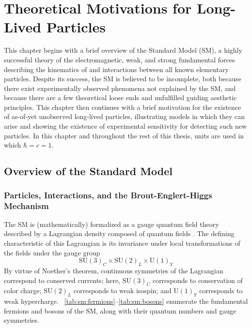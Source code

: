 \newcommand{\mtworow}[1]{\multirow{2}{*}{#1}}

\chapter{Theoretical Motivations for Long-Lived Particles}
\label{chap:theory}

This chapter begins with a brief overview of the Standard Model (SM), a highly successful theory of the electromagnetic, weak, and strong fundamental forces describing the kinematics of and interactions between all known elementary particles.
Despite its success, the SM is believed to be incomplete, both because there exist experimentally observed phenomena not explained by the SM, and because there are a few theoretical loose ends and unfulfilled guiding aesthetic principles. 
This chapter then continues with a brief motivation for the existence of as-of-yet unobserved long-lived particles, illustrating models in which they can arise and showing the existence of experimental sensitivity for detecting such new particles.
In this chapter and throughout the rest of this thesis, units are used in which $\hbar = c = 1$.

\section{Overview of the Standard Model}
\subsection{Particles, Interactions, and the Brout-Englert-Higgs Mechanism}
The SM is (mathematically) formalized as a gauge quantum field theory described by a Lagrangian density composed of quantum fields \cite{Griffiths, Srednicki, SMLag, PDG:Electroweak, PDG:Higgs}.
The defining characteristic of this Lagrangian is its invariance under local transformations of the fields under the gauge group
\begin{equation}
  \mathrm{SU}(3)_C\times\mathrm{SU}(2)_L\times\mathrm{U}(1)_Y
  \label{eq:sm:gaugegroup}
\end{equation}
By virtue of Noether's theorem, continuous symmetries of the Lagrangian correspond to conserved currents; here, $\mathrm{SU}(3)_C$ corresponds to conservation of color charge; $\mathrm{SU}(2)_L$ corresponds to weak isospin; and $\mathrm{U}(1)_Y$ corresponds to weak hypercharge.
\Tabs~\ref{tab:sm:fermions}--\ref{tab:sm:bosons} enumerate the fundamental fermions and bosons of the SM, along with their quantum numbers and gauge symmetries.

